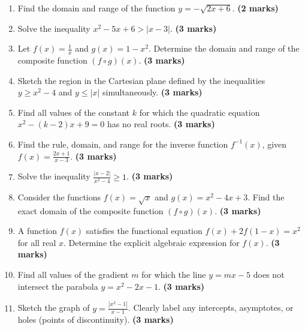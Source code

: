 \documentclass[11pt,a4paper]{article}
\begin{document}
\begin{enumerate}
    \item Find the domain and range of the function $y = -\sqrt{2x + 6}$. \hfill \textbf{(2 marks)}
    \vspace{0.5cm}

    \item Solve the inequality $x^2 - 5x + 6 > |x - 3|$. \hfill \textbf{(3 marks)}
    \vspace{0.5cm}

    \item Let $f(x) = \frac{1}{x}$ and $g(x) = 1 - x^2$. Determine the domain and range of the composite function $(f \circ g)(x)$. \hfill \textbf{(3 marks)}
    \vspace{0.5cm}

    \item Sketch the region in the Cartesian plane defined by the inequalities $y \ge x^2 - 4$ and $y \le |x|$ simultaneously. \hfill \textbf{(3 marks)}
    \vspace{0.5cm}

    \item Find all values of the constant $k$ for which the quadratic equation $x^2 - (k-2)x + 9 = 0$ has no real roots. \hfill \textbf{(3 marks)}
    \vspace{0.5cm}

    \item Find the rule, domain, and range for the inverse function $f^{-1}(x)$, given $f(x) = \frac{2x+1}{x-3}$. \hfill \textbf{(3 marks)}
    \vspace{0.5cm}

    \item Solve the inequality $\frac{|x - 2|}{x^2 - 4} \ge 1$. \hfill \textbf{(3 marks)}
    \vspace{0.5cm}

    \item Consider the functions $f(x) = \sqrt{x}$ and $g(x) = x^2 - 4x + 3$. Find the exact domain of the composite function $(f \circ g)(x)$. \hfill \textbf{(3 marks)}
    \vspace{0.5cm}

    \item A function $f(x)$ satisfies the functional equation $f(x) + 2f(1-x) = x^2$ for all real $x$. Determine the explicit algebraic expression for $f(x)$. \hfill \textbf{(3 marks)}
    \vspace{0.5cm}

    \item Find all values of the gradient $m$ for which the line $y = mx - 5$ does not intersect the parabola $y = x^2 - 2x - 1$. \hfill \textbf{(3 marks)}
    \vspace{0.5cm}

    \item Sketch the graph of $y = \frac{|x^2 - 1|}{x - 1}$. Clearly label any intercepts, asymptotes, or holes (points of discontinuity). \hfill \textbf{(3 marks)}
    \vspace{0.5cm}
\end{enumerate}
\end{document}
